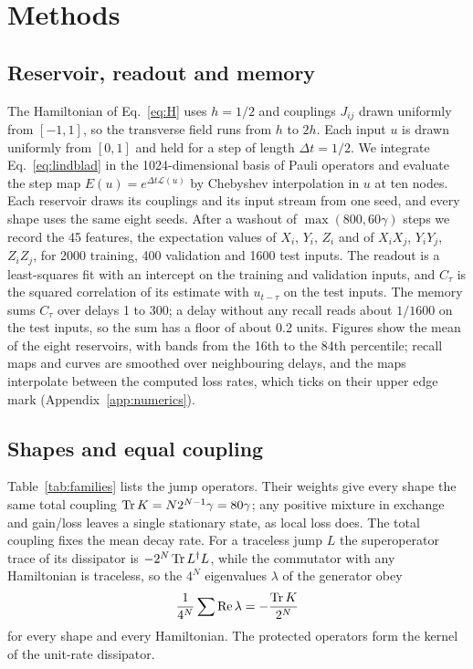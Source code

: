 \section{Methods}
\label{sec:methods}

\subsection{Reservoir, readout and memory}
\label{sec:methods-reservoir}
The Hamiltonian of Eq.~\eqref{eq:H} uses $h=1/2$ and couplings $J_{ij}$ drawn uniformly from $[-1,1]$, so the
transverse field runs from $h$ to $2h$. Each input $u$ is drawn uniformly from $[0,1]$ and held for a step of length
$\Delta t=1/2$. We integrate Eq.~\eqref{eq:lindblad} in the 1024-dimensional basis of Pauli operators and evaluate the
step map $E(u)=e^{\Delta t\mathcal L(u)}$ by Chebyshev interpolation in $u$ at ten nodes. Each reservoir draws its
couplings and its input stream from one seed, and every shape uses the same eight seeds. After a washout of
$\max(800,60\gamma)$ steps we record the 45 features, the expectation values of $X_i$, $Y_i$, $Z_i$ and of $X_iX_j$,
$Y_iY_j$, $Z_iZ_j$, for 2000 training, 400 validation and 1600 test inputs. The readout is a least-squares fit with an
intercept on the training and validation inputs, and $C_\tau$ is the squared correlation of its estimate with
$u_{t-\tau}$ on the test inputs. The memory sums $C_\tau$ over delays 1 to 300; a delay without any recall reads about
$1/1600$ on the test inputs, so the sum has a floor of about 0.2 units. Figures show the mean of the eight reservoirs,
with bands from the 16th to the 84th percentile; recall maps and curves are smoothed over neighbouring delays, and
the maps interpolate between the computed loss rates, which ticks on their upper edge mark
(Appendix~\ref{app:numerics}).

\subsection{Shapes and equal coupling}
\label{sec:methods-shapes}
Table~\ref{tab:families} lists the jump operators. Their weights give every shape the same total coupling
$\operatorname{Tr} K=N2^{N-1}\gamma=80\gamma$; any positive mixture in exchange and gain/loss leaves a single stationary state, as
local loss does. The total coupling fixes the mean decay rate. For a traceless jump $L$ the superoperator trace of its
dissipator is $-2^N\operatorname{Tr} L^\dagger L$, while the commutator with any Hamiltonian is traceless, so the $4^N$ eigenvalues
$\lambda$ of the generator obey
\begin{equation}
  \frac{1}{4^N}\sum\operatorname{Re}\lambda=-\frac{\operatorname{Tr} K}{2^N}
  \label{eq:trace}
\end{equation}
for every shape and every Hamiltonian. The protected operators form the kernel of the unit-rate dissipator.

